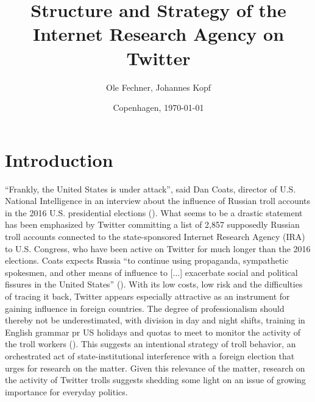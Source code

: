 \documentclass[12pt, titlepage=true, toc=bib]{scrartcl}
\begin{document}
\titlehead{}
\author{Ole Fechner, Johannes Kopf}
\title{Structure and Strategy of the Internet Research Agency on Twitter}


\date{\normalsize{Copenhagen, \today}}

\publishers{}

\maketitle[0]

\newpage

\thispagestyle{empty}
\tableofcontents

\newpage

\thispagestyle{empty}
\listoftables

\newpage

\thispagestyle{empty}
\listoffigures

\newpage
\setcounter{page}{1}

\section{Introduction}

``Frankly, the United States is under attack'', said Dan Coats, director of U.S. National Intelligence in an interview about the influence of Russian troll accounts in the 2016 U.S. presidential elections (\cite{popken_twitter_2018}). What seems to be a drastic statement has been emphasized by Twitter committing a list of 2,857 supposedly Russian troll accounts connected to the state-sponsored Internet Research Agency (IRA) to U.S. Congress, who have been active on Twitter for much longer than the 2016 elections. Coats expects Russia ``to continue using propaganda, sympathetic spokesmen, and other means of influence to [...] exacerbate social and political fissures in the United States'' (\cite{popken_twitter_2018}). With its low costs, low risk and the difficulties of tracing it back, Twitter appears especially attractive as an instrument for gaining influence in foreign countries. The degree of professionalism should thereby not be underestimated, with division in day and night shifts, training in English grammar pr US holidays and quotas to meet to monitor the activity of the troll workers (\cite{kirby_what_2018}). This suggests an intentional strategy of troll behavior, an orchestrated act of state-institutional interference with a foreign election that urges for research on the matter. Given this relevance of the matter, research on the activity of Twitter trolls suggests shedding some light on an issue of growing importance for everyday politics.
\end{document}
